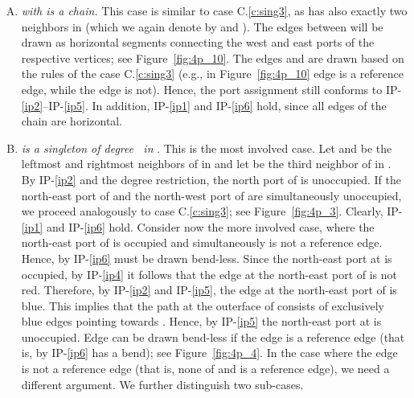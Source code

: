 \documentclass[a4paper,twoside,11pt]{article}
\begin{document}
\begin{enumerate}[C.1:]
\item \label{c:chain} \emph{ with  is a chain.} This case is similar to case C.\ref{c:sing3},
as  has also exactly two neighbors in  (which we again
denote by  and ). The edges between  will be drawn as horizontal segments connecting the west
and east ports of the respective vertices; see
Figure~\ref{fig:4p_10}. The edges  and 
are drawn based on the rules of the case C.\ref{c:sing3} (e.g., in
Figure~\ref{fig:4p_10} edge  is a reference edge, while
the edge  is not). Hence, the port assignment still
conforms to IP-\ref{ip2}--IP-\ref{ip5}. In addition, IP-\ref{ip1}
and IP-\ref{ip6} hold, since all edges of the chain are horizontal.

\item \label{c:sing4} \emph{ is a singleton of
degree~ in }. This is the most involved case. Let 
and  be the leftmost and rightmost neighbors of  in
 and let  be the third neighbor of  in .
By IP-\ref{ip2} and the degree restriction, the north port of 
is unoccupied. If the north-east port of  and the north-west
port of  are simultaneously unoccupied, we proceed analogously
to case C.\ref{c:sing3}; see Figure~\ref{fig:4p_3}.
Clearly, IP-\ref{ip1} and IP-\ref{ip6} hold. Consider now the more
involved case, where the north-east port of  is occupied and
simultaneously  is not a reference edge. Hence, by
IP-\ref{ip6}  must be drawn bend-less. Since the
north-east port at  is occupied, by IP-\ref{ip4} it follows
that the edge at the north-east port of  is not red.
Therefore, by IP-\ref{ip2} and IP-\ref{ip5}, the edge at the
north-east port of  is blue. This implies that the path
 at the outerface of  consists
of exclusively blue edges pointing towards . Hence, by
IP-\ref{ip5} the north-east port at  is unoccupied. Edge
 can be drawn bend-less if the edge  is
a reference edge (that is, by IP-\ref{ip6}  has a bend);
see Figure~\ref{fig:4p_4}. In the case where the edge  is not
a reference edge (that is, none of  and  is
a reference edge), we need a different argument.
We further distinguish two sub-cases.


\end{enumerate}
\end{document}
